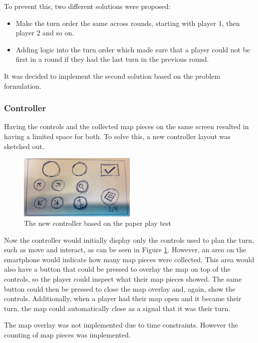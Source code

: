 To prevent this, two different solutions were proposed:
\begin{itemize}
\item Make the turn order the same across rounds, starting with player 1, then player 2 and so on.
\item Adding logic into the turn order which made sure that a player could not be first in a round if they had the last turn in the previous round.
\end{itemize}

It was decided to implement the second solution based on the problem formulation.

\subsubsection{Controller}
Having the controls and the collected map pieces on the same screen resulted in having a limited space for both. To solve this, a new controller layout was sketched out.

\begin{figure}[h]
\centering
\includegraphics[width=0.5\textwidth]{figures/RevisedControl} 
\caption{The new controller based on the paper play test}\label{fig:PPtest4}
\end{figure}

Now the controller would initially display only the controls used to plan the turn, such as move and interact, as can be seen in Figure \ref{fig:PPtest4}. However, an area on the smartphone would indicate how many map pieces were collected. This area would also have a button that could be pressed to overlay the map on top of the controls, so the player could inspect what their map pieces showed. The same button could then be pressed to close the map overlay and, again, show the controls. Additionally, when a player had their map open and it became their turn, the map could automatically close as a signal that it was their turn.

The map overlay was not implemented due to time constraints. However the counting of map pieces was implemented.